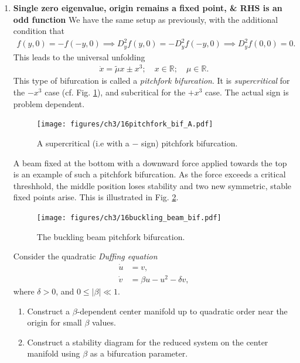 \begin{enumerate}
	\item \textbf{Single zero eigenvalue, origin remains a fixed point, \& RHS is an odd function} 
		We have the same setup as previously, with the additional condition that
		\begin{align}
			f(y,0) = - f(-y,0)\implies D^2_{y}f(y,0) = -D^2_{y}f(-y,0) \implies D^2_{y}f(0,0) = 0.
		\end{align}
	This leads to the universal unfolding 
	\begin{align}
		\dot{x} = \tilde{\mu } x \pm x^3;\quad x \in \mathbb{R};\quad \mu \in \mathbb{R}.
	\end{align}
	This type of bifurcation is called a \emph{pitchfork bifurcation}. It is \emph{supercritical} for the $-x^3$ case (cf. Fig. \ref{fig:pitchfork_bif}), and subcritical for the $+x^3$ case. The actual sign is problem dependent.
\begin{figure}[h!]
	\centering
	\texttt{[image: figures/ch3/16pitchfork\_bif\_A.pdf]}
	\caption{A supercritical (i.e with a $-$ sign) pitchfork bifurcation.}
	\label{fig:pitchfork_bif}
\end{figure}

\begin{ex}
	A beam fixed at the bottom with a downward force applied towards the top is an example of such a pitchfork bifurcation. As the force exceeds a critical threshhold, the middle position loses stability and two new symmetric, stable fixed points arise. This is illustrated in Fig. \ref{fig:buckling_beam}.
	\begin{figure}[h!]
		\centering
		\texttt{[image: figures/ch3/16buckling\_beam\_bif.pdf]}
		\caption{The buckling beam pitchfork bifurcation.}
		\label{fig:buckling_beam}
	\end{figure}
	
\end{ex}

\begin{exercise}
Consider the quadratic \textit{Duffing equation}
\begin{align}
	\dot{u} &= v, \\
	\dot{v} &= \beta u - u^2 - \delta v,
\end{align}
where $\delta > 0$, and $0 \leq |\beta| \ll 1$.
\begin{enumerate}
	\item Construct a $\beta$-dependent center manifold up to quadratic order near the origin for small $\beta$ values.
	\item Construct a stability diagram for the reduced system on the center manifold using $\beta$ as a bifurcation parameter.
\end{enumerate}
	

\end{exercise}
\end{enumerate}
